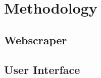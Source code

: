 \documentclass[main]{subfiles}
\begin{document}
\section{Methodology}
\subsection{Webscraper}

\subsection{User Interface}
\end{document}
